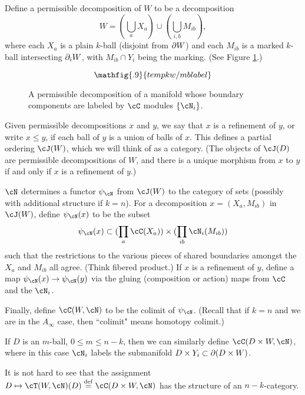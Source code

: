 Define a permissible decomposition of $W$ to be a decomposition
\[
	W = (\bigcup_a X_a) \cup (\bigcup_{i,b} M_{ib}) ,
\]
where each $X_a$ is a plain $k$-ball (disjoint from $\partial W$) and
each $M_{ib}$ is a marked $k$-ball intersecting $\partial_i W$,
with $M_{ib}\cap Y_i$ being the marking.
(See Figure \ref{mblabel}.)
\begin{figure}[!ht]\begin{equation*}
\mathfig{.9}{tempkw/mblabel}
\end{equation*}\caption{A permissible decomposition of a manifold
whose boundary components are labeled by $\cC$ modules $\{\cN_i\}$.}\label{mblabel}\end{figure}
Given permissible decompositions $x$ and $y$, we say that $x$ is a refinement
of $y$, or write $x \le y$, if each ball of $y$ is a union of balls of $x$.
This defines a partial ordering $\cJ(W)$, which we will think of as a category.
(The objects of $\cJ(D)$ are permissible decompositions of $W$, and there is a unique
morphism from $x$ to $y$ if and only if $x$ is a refinement of $y$.)

$\cN$ determines 
a functor $\psi_\cN$ from $\cJ(W)$ to the category of sets 
(possibly with additional structure if $k=n$).
For a decomposition $x = (X_a, M_{ib})$ in $\cJ(W)$, define $\psi_\cN(x)$ to be the subset
\[
	\psi_\cN(x) \sub (\prod_a \cC(X_a)) \times (\prod_{ib} \cN_i(M_{ib}))
\]
such that the restrictions to the various pieces of shared boundaries amongst the
$X_a$ and $M_{ib}$ all agree.
(Think fibered product.)
If $x$ is a refinement of $y$, define a map $\psi_\cN(x)\to\psi_\cN(y)$
via the gluing (composition or action) maps from $\cC$ and the $\cN_i$.

Finally, define $\cC(W, \cN)$ to be the colimit of $\psi_\cN$.
(Recall that if $k=n$ and we are in the $A_\infty$ case, then ``colimit" means
homotopy colimit.)

If $D$ is an $m$-ball, $0\le m \le n-k$, then we can similarly define
$\cC(D\times W, \cN)$, where in this case $\cN_i$ labels the submanifold 
$D\times Y_i \subset \partial(D\times W)$.

It is not hard to see that the assignment $D \mapsto \cT(W, \cN)(D) \deq \cC(D\times W, \cN)$
has the structure of an $n{-}k$-category.

\medskip



